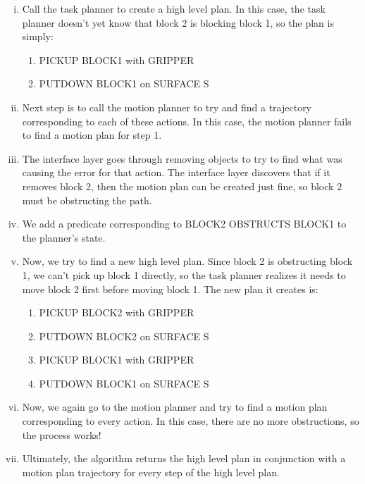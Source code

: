 \documentclass[12pt]{article}
\begin{document}
\begin{enumerate}[i.]

\item Call the task planner to create a high level plan.  
In this case, the task planner doesn't yet know that block 2 is blocking block 1, so the plan is simply:

\begin{enumerate}[1.]
\item PICKUP BLOCK1 with GRIPPER

\item PUTDOWN BLOCK1 on SURFACE S
\end{enumerate}

\item Next step is to call the motion planner to try and find a trajectory corresponding to each of these actions.  
In this case, the motion planner fails to find a motion plan for step 1.  

\item The interface layer goes through removing objects to try to find what was causing the error for that action.  
The interface layer discovers that if it removes block 2, then the motion plan can be created just fine, so block 2 must be obstructing the path.

\item We add a predicate corresponding to BLOCK2 OBSTRUCTS BLOCK1 to the planner's state.

\item Now, we try to find a new high level plan.  
Since block 2 is obstructing block 1, we can't pick up block 1 directly, so the task planner realizes it needs to move block 2 first before moving block 1. 
The new plan it creates is:

\begin{enumerate}[1.]
\item PICKUP BLOCK2 	with GRIPPER
\item PUTDOWN BLOCK2 on SURFACE S
\item PICKUP BLOCK1 with GRIPPER
\item PUTDOWN BLOCK1 on SURFACE S
\end{enumerate}

\item Now, we again go to the motion planner and try to find a motion plan corresponding to every action.
In this case, there are no more obstructions, so the process works!

\item Ultimately, the algorithm returns the high level plan in conjunction with a motion plan trajectory for every step of the high level plan.

\end{enumerate}
\end{document}
